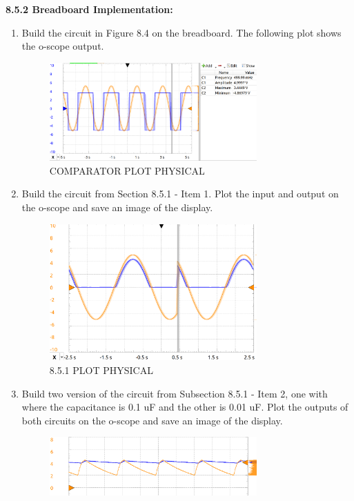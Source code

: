 \documentclass{article}
\begin{document}
\textbf{8.5.2 Breadboard Implementation:}
\begin{enumerate}
    \item Build the circuit in Figure 8.4 on the breadboard. The following plot shows the o-scope output.
    \begin{figure}[H]
        \centering
        \includegraphics[width=0.75\textwidth]{inlab_1.png}
        \caption{COMPARATOR PLOT PHYSICAL} 
        \label{fig:comp-plot-phys}
    \end{figure}
    \item Build the circuit from Section 8.5.1 - Item 1. Plot the input and output on the o-scope and save an image of the display. 
    \begin{figure}[H]
        \centering
        \includegraphics[width=0.75\textwidth]{inlab_2.png}
        \caption{8.5.1 PLOT PHYSICAL} 
        \label{fig:851-plot-phys}
    \end{figure}
    \item Build two version of the circuit from Subsection 8.5.1 - Item 2, one with where
the capacitance is 0.1 uF and the other is 0.01 uF. Plot the outputs of both
circuits on the o-scope and save an image of the display.
    \begin{figure}[H]
        \centering
        \includegraphics[width=0.75\textwidth]{inlab_3.png}

\end{figure}
\end{enumerate}
\end{document}
